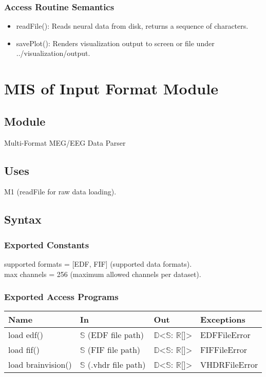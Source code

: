\documentclass[12pt, titlepage]{article}
\begin{document}
\subsubsection{Access Routine Semantics}

\begin{itemize}
\item readFile(): Reads neural data from disk, returns a sequence of characters.


\item savePlot(): Renders visualization output to screen or file under ../visualization/output.


\end{itemize}

\newpage


\section{MIS of Input Format Module}

\subsection{Module}
Multi-Format MEG/EEG Data Parser

\subsection{Uses}

\item M1 (readFile for raw data loading).

\subsection{Syntax}

\subsubsection{Exported Constants}

supported formats = [EDF, FIF] (supported data formats).\\
max channels = 256 (maximum allowed channels per dataset).


\subsubsection{Exported Access Programs}

\begin{center}
\begin{tabular}{p{2cm} p{4cm} p{4cm} p{2cm}}
\hline
\textbf{Name} & \textbf{In} & \textbf{Out} & \textbf{Exceptions} \\
\hline
load edf() & $\mathbb{S}$ (EDF file path) & $\mathbb{D}$<$\mathbb{S}$: $\mathbb{R}$[]> & EDFFileError \\
load fif() & $\mathbb{S}$ (FIF file path) & $\mathbb{D}$<$\mathbb{S}$: $\mathbb{R}$[]> & FIFFileError \\
load brainvision() & $\mathbb{S}$ (.vhdr file path) & $\mathbb{D}$<$\mathbb{S}$: $\mathbb{R}$[]> & VHDRFileError \\
\hline
\end{tabular}
\end{center}
\end{document}
